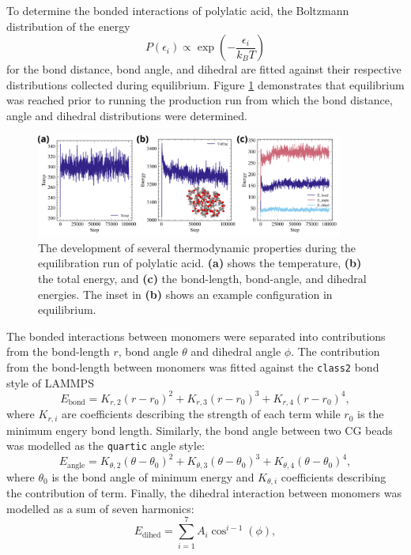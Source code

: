 \documentclass[10pt,a4paper]{labreport}
\begin{document}
\begin{itemize}
  To determine the bonded interactions of polylatic acid, the Boltzmann distribution of the energy
  \begin{equation}
    P(\epsilon_i) \propto \exp\left(-\frac{\epsilon_i}{k_B T}\right)
    \label{eq:Boltzmann}
  \end{equation} 
  for the bond distance, bond angle, and dihedral are fitted against their respective distributions collected during equilibrium. 
  Figure \ref{fig:ass1_equilib} demonstrates that equilibrium was reached prior to running the production run from which the bond distance, angle and dihedral distributions were determined.  
  \begin{figure}[h]
    \centering 
    \includegraphics[width = 0.9\textwidth]{figs/ass1_equilib.png}
    \caption{The development of several thermodynamic properties during the equilibration run of polylatic acid. \textbf{(a)} shows the temperature, \textbf{(b)} the total energy, and \textbf{(c)} the bond-length, bond-angle, and dihedral energies. The inset in \textbf{(b)} shows an example configuration in equilibrium. }
    \label{fig:ass1_equilib}
  \end{figure}

  The bonded interactions between monomers were separated into contributions from the bond-length $r$, bond angle $\theta$ and dihedral angle $\phi$.
  The contribution from the bond-length between monomers was fitted against the \texttt{class2} bond style of LAMMPS
  \begin{equation}
    E_\text{bond} = K_{r,2}(r - r_0)^2 +   K_{r,3}(r - r_0)^3 +  K_{r,4}(r - r_0)^4,
    \label{eq:ass1_bondEngery}
  \end{equation}
  where $K_{r,i}$ are coefficients describing the strength of each term while $r_0$ is the minimum engery bond length. 
  Similarly, the bond angle between two CG beads was modelled as the \texttt{quartic} angle style:
    \begin{equation}
    E_\text{angle} = K_{\theta,2}(\theta - \theta_0)^2 +   K_{\theta,3}(\theta - \theta_0)^3 +  K_{\theta,4}(\theta - \theta_0)^4,
    \label{eq:ass1_angleEngery}
  \end{equation}
  where $\theta_0$ is the bond angle of minimum energy and $K_{\theta,i}$ coefficients describing the contribution of term. 
  Finally, the dihedral interaction between monomers was modelled as a sum of seven harmonics:
  \begin{equation}
    E_\text{dihed} = \sum_{i=1}^7 A_i \cos^{i-1}(\phi),
    \label{eq:ass1_dihedEnergy}
  \end{equation}


\end{itemize}
\end{document}
